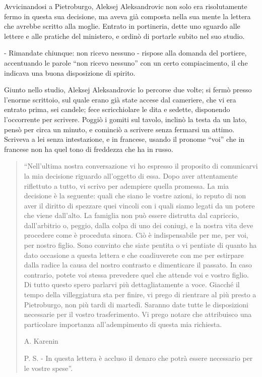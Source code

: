 \label{xiv-2} 

Avvicinandosi a Pietroburgo, Aleksej Aleksandrovic non solo era risolutamente fermo in questa sua decisione, ma aveva già composta nella sua mente la lettera che avrebbe scritto alla moglie. Entrato in portineria, dette uno sguardo alle lettere e alle pratiche del ministero, e ordinò di portarle subito nel suo studio. 

- Rimandate chiunque: non ricevo nessuno - rispose alla domanda del portiere, accentuando le parole ``non ricevo nessuno'' con un certo compiacimento, il che indicava una buona disposizione di spirito. 

Giunto nello studio, Aleksej Aleksandrovic lo percorse due volte; si fermò presso l'enorme scrittoio, sul quale erano già state accese dal cameriere, che vi era entrato prima, sei candele; fece scricchiolare le dita e sedette, disponendo l'occorrente per scrivere. Poggiò i gomiti sul tavolo, inclinò la testa da un lato, pensò per circa un minuto, e cominciò a scrivere senza fermarsi un attimo. Scriveva a lei senza intestazione, e in francese, usando il pronome ``voi'' che in francese non ha quel tono di freddezza che ha in russo. 

\begin{quote}
``Nell'ultima nostra conversazione vi ho espresso il proposito di comunicarvi la mia decisione riguardo all'oggetto di essa. Dopo aver attentamente riflettuto a tutto, vi scrivo per adempiere quella promessa. La mia decisione è la seguente: quali che siano le vostre azioni, io reputo di non aver il diritto di spezzare quei vincoli con i quali siamo legati da un potere che viene dall'alto. La famiglia non può essere distrutta dal capriccio, dall'arbitrio o, peggio, dalla colpa di uno dei coniugi, e la nostra vita deve procedere come è proceduta sinora. Ciò è indispensabile per me, per voi, per nostro figlio. Sono convinto che siate pentita o vi pentiate di quanto ha dato occasione a questa lettera e che coadiuverete con me per estirpare dalla radice la causa del nostro contrasto e dimenticare il passato. In caso contrario, potete voi stessa prevedere quel che attende voi e vostro figlio. Di tutto questo spero parlarvi più dettagliatamente a voce. Giacché il tempo della villeggiatura sta per finire, vi prego di rientrare al più presto a Pietroburgo, non più tardi di martedì. Saranno date tutte le disposizioni necessarie per il vostro trasferimento. Vi prego notare che attribuisco una particolare importanza all'adempimento di questa mia richiesta.

A. Karenin

P. S. - In questa lettera è accluso il denaro che potrà essere necessario per le vostre spese''.
\end{quote} 


